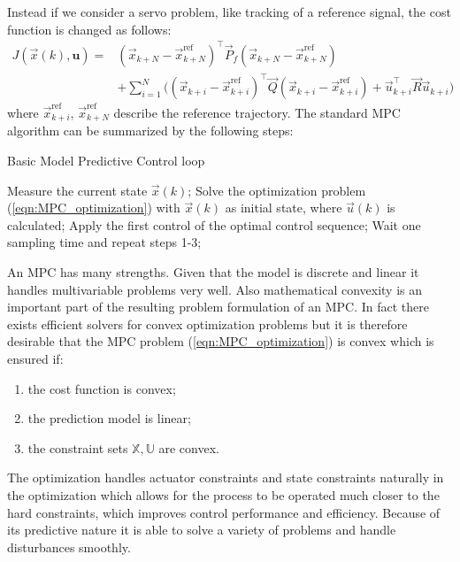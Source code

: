 Instead if we consider a servo problem, like tracking of a reference signal, the cost function is changed as follows:
\begin{equation}
\label{eqn:MPC_cost_function_servo}
\begin{aligned}
J(\vec{x}(k), \textbf{u})=& (\vec{x}_{k+N}-\vec{x}^\text{ref}_{k+N})^\intercal\vec{P}_f(\vec{x}_{k+N}-\vec{x}^\text{ref}_{k+N})\\
&+\sum_{i=1}^{N}\Big((\vec{x}_{k+i}-\vec{x}^\text{ref}_{k+i})^\intercal\vec{Q}(\vec{x}_{k+i}-\vec{x}^\text{ref}_{k+i})+\vec{u}_{k+i}^\intercal\vec{R}\vec{u}_{k+i}\Big)
\end{aligned}
\end{equation}
where $\vec{x}^\text{ref}_{k+i}$, $\vec{x}^\text{ref}_{k+N}$ describe the reference trajectory. 
The standard MPC algorithm can be summarized by the following steps:
\begin{algorithm}%
	\caption{Basic Model Predictive Control loop}
	\small
	\begin{algorithmic}[1]
		\State Measure the current state $\vec{x}(k)$;
		\State Solve the optimization problem (\ref{eqn:MPC_optimization}) with $\vec{x}(k)$ as initial state, where $\vec{u}(k)$ is calculated;
		\State Apply the first control of the optimal control sequence;
		\State Wait one sampling time and repeat steps 1-3;
	\end{algorithmic}
	\label{alg:MPCloop}
\end{algorithm}

An MPC has many strengths. Given that the model is discrete and linear it handles multivariable problems very well. Also mathematical convexity is an important part of the resulting problem formulation of an MPC. In fact there exists efficient solvers for convex optimization problems but it is therefore desirable that the MPC problem (\ref{eqn:MPC_optimization}) is convex which is ensured if:
\begin{enumerate}
\item the cost function is convex;
\item the prediction model is linear;
\item the constraint sets $\mathbb{X}, \mathbb{U}$ are convex.	
\end{enumerate}	
The optimization handles actuator constraints and state constraints naturally in the optimization which allows for
the process to be operated much closer to the hard constraints, which improves control performance and efficiency. Because of its predictive nature it is able to solve a variety of problems and handle disturbances smoothly.

